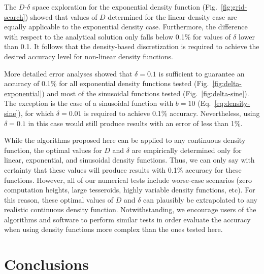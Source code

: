\documentclass[extra, referee]{gji}
\begin{document}
The $D$-$\delta$ space exploration for the exponential density function
(Fig.~\ref{fig:grid-search}) showed that values of $D$ determined for the linear density
case are equally applicable to the exponential density case.
Furthermore, the difference with respect to the analytical solution only falls below
0.1\% for values of $\delta$ lower than 0.1.
It follows that the density-based discretization is required to achieve the desired
accuracy level for non-linear density functions.

More detailed error analyses showed that $\delta = 0.1$ is sufficient to guarantee an
accuracy of 0.1\% for all exponential density functions tested
(Fig.~\ref{fig:delta-exponential})
and most of the sinusoidal functions tested (Fig.~\ref{fig:delta-sine}).
The exception is the case of a sinusoidal function with $b = 10$
(Eq.~\ref{eq:density-sine}), for which $\delta = 0.01$ is required to achieve 0.1\%
accuracy.
Nevertheless, using $\delta = 0.1$ in this case would still produce results with an
error of less than 1\%.

While the algorithms proposed here can be applied to any continuous density function,
the optimal values for $D$ and $\delta$ are empirically determined only for linear,
exponential, and sinusoidal density functions.
Thus, we can only say with certainty that these values will produce results with 0.1\%
accuracy for these functions.
However, all of our numerical tests include worse-case scenarios (zero computation
heights, large tesseroids, highly variable density functions, etc).
For this reason, these optimal values of $D$ and $\delta$ can plausibly be
extrapolated to any realistic continuous density function.
Notwithstanding, we encourage users of the algorithms and software to perform similar
tests in order evaluate the accuracy when using density functions more complex than the
ones tested here.


\section{Conclusions}
\end{document}
